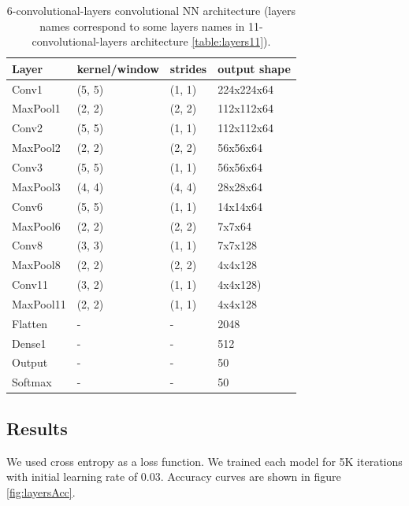 \documentclass[a4paper]{article}
\begin{document}
\begin{table}[!h]
    \caption{6-convolutional-layers convolutional NN architecture (layers names correspond to some layers names in 11-convolutional-layers architecture \ref{table:layers11}).
    \label{table:layers6}
    }
\begin{center}
    \begin{tabular}{| l | l | l | l |}
    \hline
        Layer & kernel/window& strides & output shape\\
    \hline
        Conv1  & (5, 5)&        (1, 1)&     224x224x64  \\
    \hline
        MaxPool1 & (2, 2)&      (2, 2)&     112x112x64  \\
        Conv2  & (5, 5)&        (1, 1)&     112x112x64  \\
    \hline
        MaxPool2 & (2, 2)&      (2, 2)&     56x56x64    \\
        Conv3  & (5, 5)&        (1, 1)&     56x56x64    \\
    \hline
        MaxPool3 & (4, 4)&      (4, 4)&     28x28x64    \\
        Conv6  & (5, 5)&        (1, 1)&     14x14x64  \\
    \hline
        MaxPool6 & (2, 2)&      (2, 2)&     7x7x64  \\
        Conv8  & (3, 3)&        (1, 1)&     7x7x128\\
    \hline
        MaxPool8 & (2, 2)&      (2, 2)&     4x4x128  \\
        Conv11 & (3, 2)&        (1, 1)&     4x4x128)\\  %
    \hline
        MaxPool11 & (2, 2)&      (1, 1)&     4x4x128  \\
        Flatten & - & - & 2048 \\
        Dense1 & - & - & 512 \\
    \hline
        Output & - & - & 50 \\
        Softmax & - & - & 50 \\
    \hline
    \end{tabular}
\end{center}
\end{table}

\subsection{Results}
We used cross entropy as a loss function.
We trained each model for 5K iterations with initial learning rate of 0.03.
Accuracy curves are shown in figure \ref{fig:layersAcc}.
\end{document}
